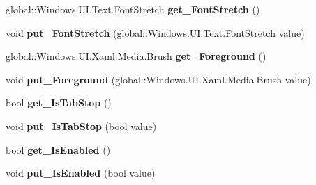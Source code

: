 \begin{DoxyCompactItemize}
global\+::\+Windows.\+U\+I.\+Text.\+Font\+Stretch {\bfseries get\+\_\+\+Font\+Stretch} ()
\item 
\mbox{\label{interface_windows_1_1_u_i_1_1_xaml_1_1_controls_1_1_i_control_ad35a998ea47ff36b5d343fadbc164608}} 
void {\bfseries put\+\_\+\+Font\+Stretch} (global\+::\+Windows.\+U\+I.\+Text.\+Font\+Stretch value)
\item 
\mbox{\label{interface_windows_1_1_u_i_1_1_xaml_1_1_controls_1_1_i_control_a47d44a65491cf9594c0e06bb0f5f2d81}} 
global\+::\+Windows.\+U\+I.\+Xaml.\+Media.\+Brush {\bfseries get\+\_\+\+Foreground} ()
\item 
\mbox{\label{interface_windows_1_1_u_i_1_1_xaml_1_1_controls_1_1_i_control_a6a0ed2bdfead49d6dd9e637cc2a53e1a}} 
void {\bfseries put\+\_\+\+Foreground} (global\+::\+Windows.\+U\+I.\+Xaml.\+Media.\+Brush value)
\item 
\mbox{\label{interface_windows_1_1_u_i_1_1_xaml_1_1_controls_1_1_i_control_a20a0b52e3d736f000750ae5521ff5331}} 
bool {\bfseries get\+\_\+\+Is\+Tab\+Stop} ()
\item 
\mbox{\label{interface_windows_1_1_u_i_1_1_xaml_1_1_controls_1_1_i_control_aa68f56eae9d742596d921ebd0fa1d01a}} 
void {\bfseries put\+\_\+\+Is\+Tab\+Stop} (bool value)
\item 
\mbox{\label{interface_windows_1_1_u_i_1_1_xaml_1_1_controls_1_1_i_control_af6badb421eed5eedf78de5f6a798069f}} 
bool {\bfseries get\+\_\+\+Is\+Enabled} ()
\item 
\mbox{\label{interface_windows_1_1_u_i_1_1_xaml_1_1_controls_1_1_i_control_a77bf29586295b2ff15c2306dc6daf932}} 
void {\bfseries put\+\_\+\+Is\+Enabled} (bool value)
\item 
\mbox{\label{interface_windows_1_1_u_i_1_1_xaml_1_1_controls_1_1_i_control_a0849d00c16f282e234c52079d37fbd5a}} 

\end{DoxyCompactItemize}
